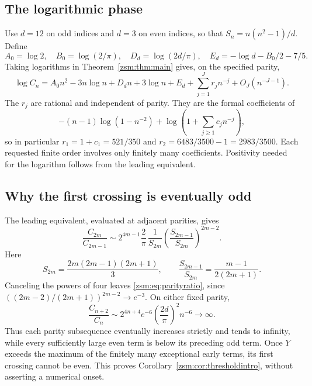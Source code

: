 \documentclass[11pt]{article}
\theoremstyle{definition}\newtheorem{definition}[theorem]{Definition}
\theoremstyle{remark}\newtheorem{remark}[theorem]{Remark}
\begin{document}
\subsection{The logarithmic phase}
Use $d=12$ on odd indices and $d=3$ on even indices, so that
$S_n=n(n^2-1)/d$. Define
\begin{equation}\label{zsm:eq:inverseconstants}
 A_0=\log2,\quad B_0=\log(2/\pi),\quad
 D_d=\log(2d/\pi),\quad E_d=-\log d-B_0/2-7/5.
\end{equation}
Taking logarithms in Theorem~\ref{zsm:thm:main} gives, on the specified parity,
\begin{equation}\label{zsm:eq:logphase}
 \log C_n=A_0n^2-3n\log n+D_dn+3\log n+E_d
          +\sum_{j=1}^Jr_jn^{-j}+O_J(n^{-J-1}).
\end{equation}
The $r_j$ are rational and independent of parity. They are the formal
coefficients of
\[
 -(n-1)\log(1-n^{-2})+
       \log\left(1+\sum_{j\ge1}c_jn^{-j}\right),
\]
so in particular $r_1=1+c_1=521/350$ and $r_2=6483/3500-1=2983/3500$.
Each requested finite order involves only
finitely many coefficients. Positivity needed for the logarithm follows from
the leading equivalent.

\subsection{Why the first crossing is eventually odd}
The leading equivalent, evaluated at adjacent parities, gives
\[
 \frac{C_{2m}}{C_{2m-1}}\sim
 2^{4m-1}\frac2\pi\,\frac1{S_{2m}}
       \left(\frac{S_{2m-1}}{S_{2m}}\right)^{2m-2}.
\]
Here
\[
 S_{2m}=\frac{2m(2m-1)(2m+1)}3,\qquad
 \frac{S_{2m-1}}{S_{2m}}=\frac{m-1}{2(2m+1)}.
\]
Canceling the powers of four leaves \eqref{zsm:eq:parityratio}, since
$((2m-2)/(2m+1))^{2m-2}\to e^{-3}$.
On either fixed parity,
\begin{equation}\label{zsm:eq:step2ratio}
 \frac{C_{n+2}}{C_n}\sim
 2^{4n+4}e^{-6}\left(\frac{2d}{\pi}\right)^2n^{-6}\longrightarrow\infty.
\end{equation}
Thus each parity subsequence eventually increases strictly and tends to
infinity, while every sufficiently large even term is below its preceding odd
term. Once $Y$ exceeds the maximum of the finitely many exceptional early
terms, its first crossing cannot be even. This proves
Corollary~\ref{zsm:cor:thresholdintro}, without asserting a numerical onset.
\end{document}
